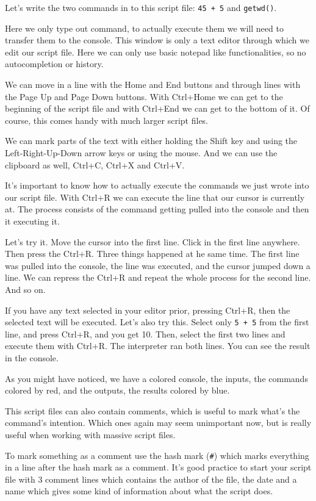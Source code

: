 \documentclass[
]{book}
\begin{document}
Let's write the two commands in to this script file: \texttt{45\ +\ 5} and
\texttt{getwd()}.

Here we only type out command, to actually execute them we will need to
transfer them to the console. This window is only a text editor through
which we edit our script file. Here we can only use basic notepad like
functionalities, so no autocompletion or history.

We can move in a line with the Home and End
buttons and through lines with the Page Up and Page
Down buttons. With Ctrl+Home we can get to the
beginning of the script file and with Ctrl+End we can get to
the bottom of it. Of course, this comes handy with much larger script
files.

We can mark parts of the text with either holding the Shift
key and using the Left-Right-Up-Down arrow keys or using the
mouse. And we can use the clipboard as well, Ctrl+C,
Ctrl+X and Ctrl+V.

It's important to know how to actually execute the commands we just
wrote into our script file. With Ctrl+R we can execute the
line that our cursor is currently at. The process consists of the
command getting pulled into the console and then it executing it.

Let's try it. Move the cursor into the first line. Click in the first
line anywhere. Then press the Ctrl+R. Three things happened
at he same time. The first line was pulled into the console, the line
was executed, and the cursor jumped down a line. We can repress the
Ctrl+R and repeat the whole process for the second line. And
so on.

If you have any text selected in your editor prior, pressing
Ctrl+R, then the selected text will be executed. Let's also
try this. Select only \texttt{5\ +\ 5} from the first line, and press
Ctrl+R, and you get 10. Then, select the first two lines and
execute them with Ctrl+R. The interpreter ran both lines. You
can see the result in the console.

As you might have noticed, we have a colored console, the inputs, the
commands colored by red, and the outputs, the results colored by blue.

This script files can also contain comments, which is useful to mark
what's the command's intention. Which ones again may seem unimportant
now, but is really useful when working with massive script files.

To mark something as a comment use the hash mark (\texttt{\#}) which marks
everything in a line after the hash mark as a comment. It's good
practice to start your script file with 3 comment lines which contains
the author of the file, the date and a name which gives some kind of
information about what the script does.
\end{document}

